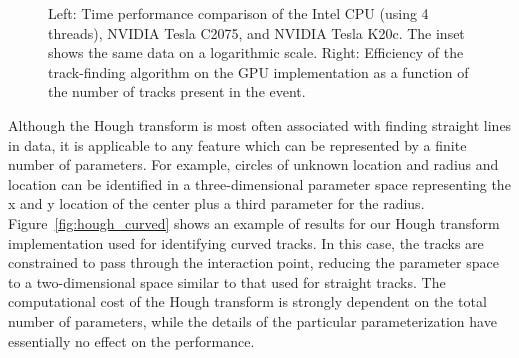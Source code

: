 \documentclass{JINST}
\begin{document}
\begin{figure}[!Hhtb]
\begin{center}
  \caption{Left: Time performance comparison of the Intel CPU (using 4 threads), NVIDIA Tesla C2075, and NVIDIA
    Tesla K20c. The inset shows the same data on a logarithmic scale. Right: Efficiency of the track-finding
    algorithm on the GPU implementation as a function of the number of tracks present in the
    event.}
\end{center}
\end{figure}

Although the Hough transform is most often associated with finding straight lines in data, it is applicable to any feature which can be represented 
by a finite number of parameters.  For example, circles of unknown location and radius and location can be identified in a three-dimensional parameter 
space representing the x and y location of the center plus a third parameter for the radius.  Figure~\ref{fig:hough_curved} shows
an example of results for our Hough transform implementation used for identifying curved tracks.  In this case, the
tracks are constrained to pass through the interaction point, reducing the parameter space to a two-dimensional space
similar to that used for straight tracks.
The computational cost of the Hough transform is strongly dependent on the total number of parameters, while the details of the particular parameterization
 have essentially no effect on the performance.
\end{document}
